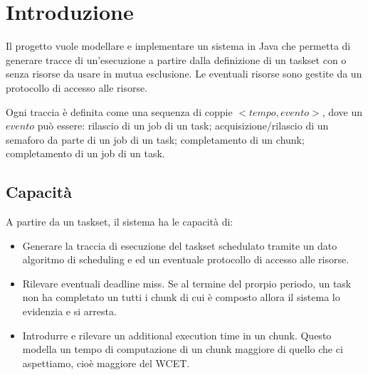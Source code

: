 \chapter{Introduzione}
Il progetto vuole modellare e implementare un sistema in Java che permetta di generare tracce di un'esecuzione a partire dalla definizione di un taskset con o senza risorse da usare in mutua esclusione. Le eventuali risorse sono gestite da un protocollo di accesso alle risorse.

Ogni traccia è definita come una sequenza di coppie $<tempo, evento>$, dove un $evento$ può essere: rilascio di un job di un task; acquisizione/rilascio di un semaforo da parte di un job di un task; completamento di un chunk; completamento di un job di un task.

\section{Capacità}
A partire da un taskset, il sistema ha le capacità di:
\begin{itemize}
    \item Generare la traccia di esecuzione del taskset schedulato tramite un dato algoritmo di scheduling e ed un eventuale protocollo di accesso alle risorse.
    \item Rilevare eventuali deadline miss. Se al termine del prorpio periodo, un task non ha completato un tutti i chunk di cui è composto allora il sistema lo evidenzia e si arresta.
    \item Introdurre e rilevare un additional execution time in un chunk. Questo modella un tempo di computazione di un chunk maggiore di quello che ci aspettiamo, cioè maggiore del WCET.
\end{itemize}